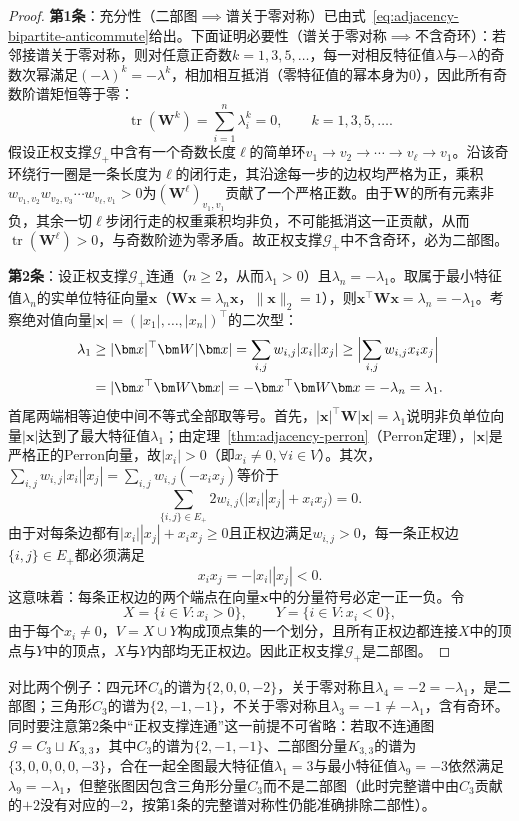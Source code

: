 \begin{proof}
\textbf{第1条}：充分性（二部图$\implies$谱关于零对称）已由式~\eqref{eq:adjacency-bipartite-anticommute}给出。下面证明必要性（谱关于零对称$\implies$不含奇环）：若邻接谱关于零对称，则对任意正奇数$k=1,3,5,\ldots$，每一对相反特征值$\lambda$与$-\lambda$的奇数次幂滿足$(-\lambda)^k=-\lambda^k$，相加相互抵消（零特征值的幂本身为$0$），因此所有奇数阶谱矩恒等于零：
\[
\operatorname{tr}(\bm W^k)=\sum_{i=1}^n\lambda_i^k=0,\qquad k=1,3,5,\ldots.
\]
假设正权支撑$\mathcal G_+$中含有一个奇数长度$\ell$的简单环$v_1\to v_2\to\cdots\to v_\ell\to v_1$。沿该奇环绕行一圈是一条长度为$\ell$的闭行走，其沿途每一步的边权均严格为正，乘积$w_{v_1,v_2}w_{v_2,v_3}\cdots w_{v_\ell,v_1}>0$为$(\bm W^\ell)_{v_1,v_1}$贡献了一个严格正数。由于$\bm W$的所有元素非负，其余一切$\ell$步闭行走的权重乘积均非负，不可能抵消这一正贡献，从而$\operatorname{tr}(\bm W^\ell)>0$，与奇数阶迹为零矛盾。故正权支撑$\mathcal G_+$中不含奇环，必为二部图。

\textbf{第2条}：设正权支撑$\mathcal G_+$连通（$n\geq 2$，从而$\lambda_1>0$）且$\lambda_n=-\lambda_1$。取属于最小特征值$\lambda_n$的实单位特征向量$\bm x$（$\bm W\bm x=\lambda_n\bm x$，$\|\bm x\|_2=1$），则$\bm x^\top\bm W\bm x=\lambda_n=-\lambda_1$。考察绝对值向量$|\bm x|=(|x_1|,\ldots,|x_n|)^\top$的二次型：
\[
\begin{aligned}
\lambda_1
&\geq|\bm x|^\top\bm W|\bm x|
=\sum_{i,j}w_{i,j}|x_i||x_j|
\geq\Bigl|\sum_{i,j}w_{i,j}x_i x_j\Bigr|\\
&=|\bm x^\top\bm W\bm x|
=-\bm x^\top\bm W\bm x
=-\lambda_n=\lambda_1.
\end{aligned}
\]
首尾两端相等迫使中间不等式全部取等号。首先，$|\bm x|^\top\bm W|\bm x|=\lambda_1$说明非负单位向量$|\bm x|$达到了最大特征值$\lambda_1$；由定理~\ref{thm:adjacency-perron}（Perron定理），$|\bm x|$是严格正的Perron向量，故$|x_i|>0$（即$x_i\neq 0,\forall i\in V$）。其次，$\sum_{i,j}w_{i,j}|x_i||x_j|=\sum_{i,j}w_{i,j}(-x_i x_j)$等价于
\[
\sum_{\{i,j\}\in E_+}2w_{i,j}\bigl(|x_i||x_j|+x_i x_j\bigr)=0.
\]
由于对每条边都有$|x_i||x_j|+x_i x_j\geq 0$且正权边满足$w_{i,j}>0$，每一条正权边$\{i,j\}\in E_+$都必须满足
\[
x_i x_j=-|x_i||x_j|<0.
\]
这意味着：每条正权边的两个端点在向量$\bm x$中的分量符号必定一正一负。令
\[
X=\{i\in V:x_i>0\},\qquad Y=\{i\in V:x_i<0\},
\]
由于每个$x_i\neq 0$，$V=X\cup Y$构成顶点集的一个划分，且所有正权边都连接$X$中的顶点与$Y$中的顶点，$X$与$Y$内部均无正权边。因此正权支撑$\mathcal G_+$是二部图。
\end{proof}

对比两个例子：四元环$C_4$的谱为$\{2,0,0,-2\}$，关于零对称且$\lambda_4=-2=-\lambda_1$，是二部图；三角形$C_3$的谱为$\{2,-1,-1\}$，不关于零对称且$\lambda_3=-1\neq -\lambda_1$，含有奇环。同时要注意第2条中“正权支撑连通”这一前提不可省略：若取不连通图$\mathcal G=C_3\sqcup K_{3,3}$，其中$C_3$的谱为$\{2,-1,-1\}$、二部图分量$K_{3,3}$的谱为$\{3,0,0,0,0,-3\}$，合在一起全图最大特征值$\lambda_1=3$与最小特征值$\lambda_9=-3$依然满足$\lambda_9=-\lambda_1$，但整张图因包含三角形分量$C_3$而不是二部图（此时完整谱中由$C_3$贡献的$+2$没有对应的$-2$，按第1条的完整谱对称性仍能准确排除二部性）。
